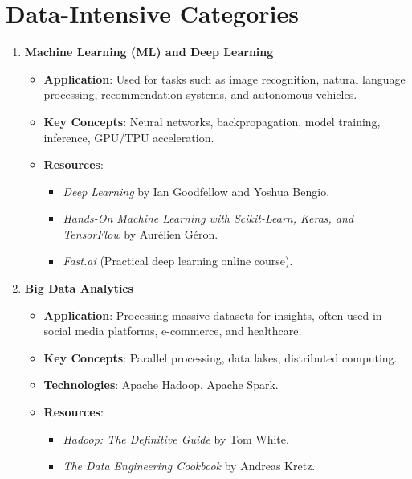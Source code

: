 \documentclass{article}
\begin{document}
\section{Data-Intensive Categories}

\begin{enumerate}
    \item \textbf{Machine Learning (ML) and Deep Learning}
    \begin{itemize}
        \item \textbf{Application}: Used for tasks such as image recognition, natural language processing, recommendation systems, and autonomous vehicles.
        \item \textbf{Key Concepts}: Neural networks, backpropagation, model training, inference, GPU/TPU acceleration.
        \item \textbf{Resources}:
        \begin{itemize}
            \item \textit{Deep Learning} by Ian Goodfellow and Yoshua Bengio.
            \item \textit{Hands-On Machine Learning with Scikit-Learn, Keras, and TensorFlow} by Aurélien Géron.
            \item \textit{Fast.ai} (Practical deep learning online course).
        \end{itemize}
    \end{itemize}
    
    \item \textbf{Big Data Analytics}
    \begin{itemize}
        \item \textbf{Application}: Processing massive datasets for insights, often used in social media platforms, e-commerce, and healthcare.
        \item \textbf{Key Concepts}: Parallel processing, data lakes, distributed computing.
        \item \textbf{Technologies}: Apache Hadoop, Apache Spark.
        \item \textbf{Resources}:
        \begin{itemize}
            \item \textit{Hadoop: The Definitive Guide} by Tom White.
            \item \textit{The Data Engineering Cookbook} by Andreas Kretz.
        \end{itemize}
    \end{itemize}


\end{enumerate}
\end{document}
